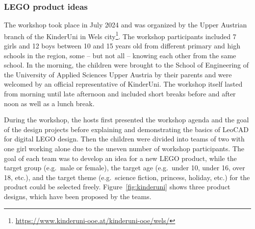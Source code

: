 \documentclass{PDS}
\begin{document}
\subsubsection{LEGO product ideas}
\label{sec:school-lego}

The workshop took place in July 2024 and was organized by the Upper Austrian branch of the KinderUni in Wels city\footnote{\url{https://www.kinderuni-ooe.at/kinderuni-ooe/wels/}}.
The workshop participants included 7 girls and 12 boys between 10 and 15 years old from different primary and high schools in the region, some -- but not all -- knowing each other from the same school.
In the morning, the children were brought to the School of Engineering of the University of Applied Sciences Upper Austria by their parents and were welcomed by an official representative of KinderUni.
The workshop itself lasted from morning until late afternoon and included short breaks before and after noon as well as a lunch break.

During the workshop, the hosts first presented the workshop agenda and the goal of the design projects before explaining and demonstrating the basics of LeoCAD for digital LEGO design.
Then the children were divided into teams of two with one girl working alone due to the uneven number of workshop participants.
The goal of each team was to develop an idea for a new LEGO product, while the target group (e.g.\ male or female), the target age (e.g.\ under 10, under 16, over 18, etc.), and the target theme (e.g.\ science fiction, princess, holiday, etc.) for the product could be selected freely.
Figure~\ref{fig:kinderuni} shows three product designs, which have been proposed by the teams.
\end{document}
